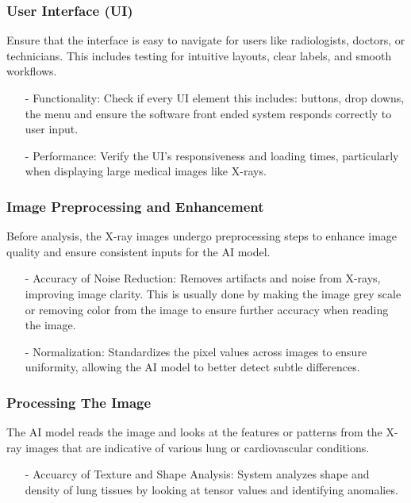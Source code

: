 \documentclass[12pt, titlepage]{article}
\begin{document}
\subsubsection{User Interface (UI)}
Ensure that the interface is easy to navigate for users like radiologists, doctors, or technicians. This includes testing for intuitive layouts, clear labels, and smooth workflows.
\begin{itemize}
    \item[-] Functionality: Check if every UI element this includes: buttons, drop downs, the menu and ensure the software front ended system responds correctly to user input.
    \item[-] Performance: Verify the UI’s responsiveness and loading times, particularly when displaying large medical images like X-rays.
\end{itemize}

\subsubsection{Image Preprocessing and Enhancement}
Before analysis, the X-ray images undergo preprocessing steps to enhance image quality and ensure consistent inputs for the AI model.
\begin{itemize}
    \item[-] Accuracy of Noise Reduction: Removes artifacts and noise from X-rays, improving image clarity. This is usually done by making the image grey scale or removing color from the image to ensure further accuracy when reading the image. 
    \item[-] Normalization: Standardizes the pixel values across images to ensure uniformity, allowing the AI model to better detect subtle differences.
\end{itemize}

\subsubsection{Processing The Image}
The AI model reads the image and looks at the features or patterns from the X-ray images that are indicative of various lung or cardiovascular conditions.
\begin{itemize}
    \item[-] Accuarcy of Texture and Shape Analysis: System analyzes shape and density of lung tissues by looking at tensor values and identifying anomalies.
\end{itemize}
\end{document}
